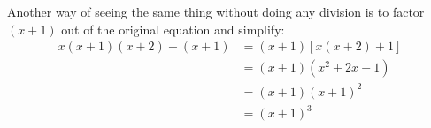 \documentclass[fleqn,addpoints]{exam}
\begin{document}
\begin{questions}
\begin{solution}
          Another way of seeing the same thing without doing any division is to factor $(x+1)$ out of the original
          equation and simplify:
          \begin{align*}
            x(x + 1)(x + 2) + (x + 1) &= (x+1) [ x(x+2) + 1 ] \\
                                      &= (x + 1) \left( x^2 + 2x + 1 \right) \\
                                      &= (x + 1) (x + 1)^2 \\
                                      &= (x + 1)^3 \\
          \end{align*}
          
        \end{solution}
  \end{questions}
\end{document}
